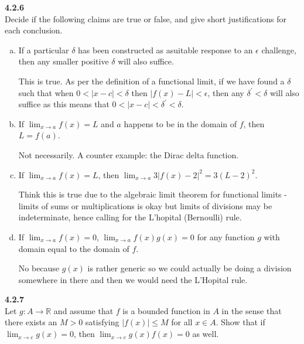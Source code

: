 \textbf{4.2.6}
\\

Decide if the following claims are true or false, and give short justifications for each conclusion.

\begin{enumerate}[(a)]
\item If a particular $\delta$ has been constructed as asuitable response to an $\epsilon$ challenge, then any smaller positive
$\delta$ will also suffice.

This is true. As per the definition of a functional limit, if we have found a $\delta$ such that when $0 < |x-c| < \delta$
then $|f(x) - L|<\epsilon$, then any $\delta^\prime < \delta$ will also suffice as this means that
$0 < |x-c| < \delta^\prime < \delta$.


\item If $\lim_{x\rightarrow a} f(x) = L$ and $a$ happens to be in the domain of $f$, then $L = f(a)$.

Not necessarily.
A counter example: the Dirac delta function.

\item If $\lim_{x\rightarrow a} f(x) = L$, then $\lim_{x\rightarrow a} 3|f(x) - 2|^2 = 3(L-2)^2$.

Think this is true due to the algebraic limit theorem for functional limits -
limits of sums or multiplications is okay but limits of divisions
may be indeterminate, hence calling for the L'hopital (Bernoulli) rule.

\item If $\lim_{x\rightarrow a} f(x) = 0$, $\lim_{x\rightarrow a} f(x)g(x) = 0$ for any function $g$ with domain equal to the
domain of $f$.

No because $g(x)$ is rather generic so we could actually be doing a division somewhere in there and then we would need the
L'Hopital rule.

\end{enumerate}



\textbf{4.2.7}
\\

Let $g : A \rightarrow \mathbb{R}$ and assume that $f$ is a bounded function in $A$
in the sense that there exists an $M > 0$ satisfying $|f(x)| \leq M$ for all $x \in A$.
Show that if $\lim_{x\rightarrow c} g(x) = 0$,
then $\lim_{x\rightarrow c} g(x)f(x) = 0$ as well.
\\

